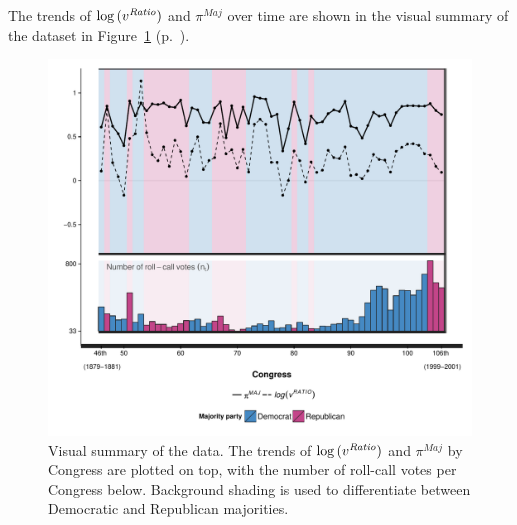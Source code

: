 The trends of $\log{(v^{\it Ratio})}$ and $\pi^{Maj}$ over time are shown in the visual summary 
of the dataset in Figure~\ref{fig:data_summary} (p.~\pageref{fig:data_summary}). \\[10pt]


\begin{figure}[p]
\centering
	\includegraphics[scale=0.75]{sections/figs/vis_summary}
\caption{Visual summary of the data. The trends of $\log{(v^{\it Ratio} )}$ and $\pi^{Maj}$ by 
Congress are plotted on top, with the number of roll-call votes per Congress below. Background 
shading is used to differentiate between Democratic and Republican majorities.}
\label{fig:data_summary}
\end{figure}
%

%

